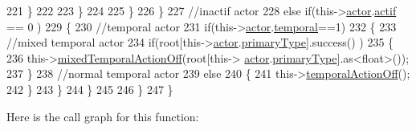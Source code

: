 \begin{DoxyCode}
221                     \}
222                                         
223                 \}
224 
225             \}
226         \}
227         \textcolor{comment}{//inactif actor}
228         \textcolor{keywordflow}{else} \textcolor{keywordflow}{if}(this->\hyperlink{class_cool_board_actor_a8f190db9f7a39fddbcef7f152da970e9}{actor}.\hyperlink{struct_cool_board_actor_1_1state_a7963178c2de01ef0d2861f9f59ad6f3c}{actif} == 0 )
229         \{
230             \textcolor{comment}{//temporal actor}
231             \textcolor{keywordflow}{if}(this->\hyperlink{class_cool_board_actor_a8f190db9f7a39fddbcef7f152da970e9}{actor}.\hyperlink{struct_cool_board_actor_1_1state_a6442a8c3a30abc48472f3e5284b786ea}{temporal}==1)
232             \{
233                 \textcolor{comment}{//mixed temporal actor}
234                 \textcolor{keywordflow}{if}(root[this->\hyperlink{class_cool_board_actor_a8f190db9f7a39fddbcef7f152da970e9}{actor}.\hyperlink{struct_cool_board_actor_1_1state_a8a0b318fd2814cf67fe74ee8164df55e}{primaryType}].success() )
235                 \{
236                     this->\hyperlink{class_cool_board_actor_a00b29c4abf0388551aa6812372113cf1}{mixedTemporalActionOff}(root[this->
      \hyperlink{class_cool_board_actor_a8f190db9f7a39fddbcef7f152da970e9}{actor}.\hyperlink{struct_cool_board_actor_1_1state_a8a0b318fd2814cf67fe74ee8164df55e}{primaryType}].as<\textcolor{keywordtype}{float}>());
237                 \}
238                 \textcolor{comment}{//normal temporal actor}
239                 \textcolor{keywordflow}{else}
240                 \{
241                     this->\hyperlink{class_cool_board_actor_a02698bd647df49cabbe74513d4d88918}{temporalActionOff}();
242                 \}
243             \}           
244         \}
245 
246     \} 
247 \}
\end{DoxyCode}
Here is the call graph for this function\+:
\nopagebreak

